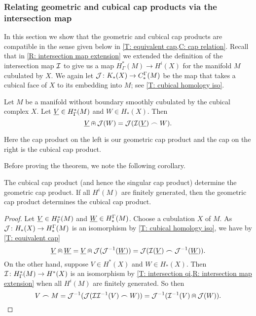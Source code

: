 \subsubsection{Relating geometric and cubical cap products via the intersection map}

In this section we show that the geometric and cubical cap products are compatible in the sense given below in \cref{T: equivalent cap,C: cap relation}.
Recall that in \cref{R: intersection map extension} we extended the definition of the intersection map $\mathcal{I}$ to give us a map $H^*_\Gamma(M) \to H^i(X)$ for the manifold $M$ cubulated by $X$.
We again let $\mathcal{J} \colon K_*(X) \to C^\Gamma_*(M)$ be the map that takes a cubical face of $X$ to its embedding into $M$; see \cref{T: cubical homology iso}.

\begin{theorem}\label{T: equivalent cap}
	Let $M$ be a manifold without boundary smoothly cubulated by the cubical complex $X$.
	Let $\underline{V} \in H^*_\Gamma(M)$ and $W \in H_*(X )$.
	Then
	$$\underline{V} \nplus \mathcal{J}(W) = \mathcal{J}(\mathcal{I}(\underline{V})\frown W).$$
\end{theorem}

Here the cap product on the left is our geometric cap product and the cap on the right is the cubical cap product.

Before proving the theorem, we note the following corollary.

\begin{corollary}\label{C: cap relation}
	The cubical cap product (and hence the singular cap product) determine the geometric cap product.
	If all $H^i(M)$ are finitely generated, then the geometric cap product determines the cubical cap product.
\end{corollary}

\begin{proof}
	Let $\underline{V} \in H^*_\Gamma(M)$ and $\underline{W} \in H_*^\Gamma(M)$.
	Choose a cubulation $X$ of $M$.
	As $\mathcal{J} \colon H_*(X) \to H_*^\Gamma(M)$ is an isomorphism by \cref{T: cubical homology iso}, we have by \cref{T: equivalent cap}
	$$\underline{V}\nplus \underline{W} = \underline{V}\nplus \mathcal{J}(\mathcal{J}^{-1}(\underline{W})) = \mathcal{J}(\mathcal{I}(\underline{V})\frown \mathcal{J}^{-1}(\underline{W})).$$
	On the other hand, suppose $V \in H^*(X)$ and $W \in H_*(X)$.
	Then $\mathcal{I} \colon H^*_\Gamma(M) \to H^*(X)$ is an isomorphism by \cref{T: intersection qi,R: intersection map extension} when all $H^i(M)$ are finitely generated.
	So then
	$$V\frown M = \mathcal{J}^{-1}(\mathcal{J}(\mathcal{I}\mathcal{I}^{-1}(V)\frown W)) = \mathcal{J}^{-1}(\mathcal{I}^{-1}(V) \nplus \mathcal{J}(W)).$$
\end{proof}

